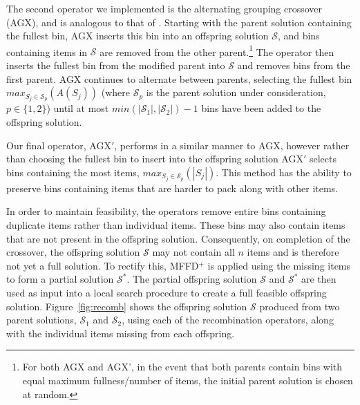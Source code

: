 \documentclass[authoryear]{elsarticle}
\begin{document}
The second operator we implemented is the alternating grouping crossover (AGX), and is analogous to that of \citet{quiroz2015}. Starting with the parent solution containing the fullest bin, AGX inserts this bin into an offspring solution $\mathcal{S}$, and bins containing items in $\mathcal{S}$ are removed from the other parent.\footnote{For both AGX and AGX', in the event that both parents contain bins with equal maximum fullness/number of items, the initial parent solution is chosen at random.} The operator then inserts the fullest bin from the modified parent into $\mathcal{S}$ and removes bins from the first parent. AGX continues to alternate between parents, selecting the fullest bin $max_{S_j \in \mathcal{S}_p} (A(S_j))$ (where $\mathcal{S}_p$ is the parent solution under consideration, $p \in \{1,2\}$) until at most $min (|\mathcal{S}_1|,|\mathcal{S}_2|) - 1$ bins have been added to the offspring solution.

Our final operator, AGX$'$, performs in a similar manner to AGX, however rather than choosing the fullest bin to insert into the offspring solution AGX$'$ selects bins containing the most items, $max_{S_j \in \mathcal{S}_p} (|S_j|)$. This method has the ability to preserve bins containing items that are harder to pack along with other items. 

In order to maintain feasibility, the operators remove entire bins containing duplicate items rather than individual items. These bins may also contain items that are not present in the offspring solution. Consequently, on completion of the crossover, the offspring solution $\mathcal{S}$ may not contain all $n$ items and is therefore not yet a full solution. To rectify this, MFFD$^+$ is applied using the missing items to form a partial solution $\mathcal{S}^*$. The partial offspring solution $\mathcal{S}$ and $\mathcal{S}^*$ are then used as input into a local search procedure to create a full feasible offspring solution. Figure~\ref{fig:recomb} shows the offspring solution $\mathcal{S}$ produced from two parent solutions, $\mathcal{S}_1$ and $\mathcal{S}_2$, using each of the recombination operators, along with the individual items missing from each offspring.

\begin{figure}[H]	
	\centering
	\begin{minipage}{0.31\textwidth}
		
	\end{minipage} \hspace{15mm}
	\begin{minipage}{0.31\textwidth}
		
	\end{minipage}
\end{figure}
\end{document}
